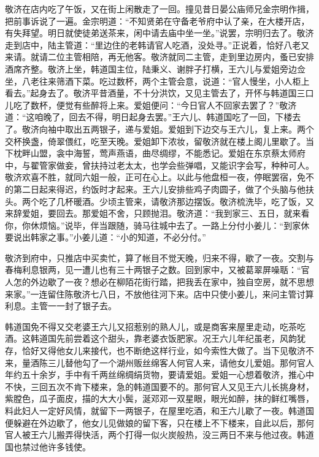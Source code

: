 敬济在店内吃了午饭，又在街上闲散走了一回。撞见昔日晏公庙师兄金宗明作揖，把前事诉说了一遍。金宗明道：“不知贤弟在守备老爷府中认了亲，在大楼开店，有失拜望。明日就使徒弟送茶来，闲中请去庙中坐一坐。”说罢，宗明归去了。敬济走到店中，陆主管道：“里边住的老韩请官人吃酒，没处寻。”正说着，恰好八老又来请。就请二位主管相陪，再无他客。敬济就同二主管，走到里边房内，蚤已安排酒席齐整。敬济上坐，韩道国主位，陆秉义、谢胖子打横，王六儿与爱姐旁边佥坐，八老往来筛酒下菜。吃过数杯，两个主管会意，说道：“官人慢坐，小人柜上看去。”起身去了。敬济平昔酒量，不十分洪饮，又见主管去了，开怀与韩道国三口儿吃了数杯，便觉有些醉将上来。爱姐便问：“今日官人不回家去罢了？”敬济道：“这咱晚了，回去不得，明日起身去罢。”王六儿、韩道国吃了一回，下楼去了。敬济向袖中取出五两银子，递与爱姐。爱姐到下边交与王六儿，复上来。两个交杯换盏，倚翠偎红，吃至天晚。爱姐卸下浓妆，留敬济就在楼上阁儿里歇了。当下枕畔山盟，衾中海誓，莺声燕语，曲尽绸缪，不能悉记。爱姐在东京蔡太师府中，与翟管家做妾，曾扶持过老太太，也学会些弹唱，又能识字会写，种种可人。敬济欢喜不胜，就同六姐一般，正可在心上。以此与他盘桓一夜，停眠罢宿，免不的第二日起来得迟，约饭时才起来。王六儿安排些鸡子肉圆子，做了个头脑与他扶头。两个吃了几杯暖酒。少顷主管来，请敬济那边摆饭。敬济梳洗毕，吃了饭，又来辞爱姐，要回去。那爱姐不舍，只顾抛泪。敬济道：“我到家三、五日，就来看你，你休烦恼。”说毕，伴当跟随，骑马往城中去了。一路上分付小姜儿：“到家休要说出韩家之事。”小姜儿道：“小的知道，不必分付。”

敬济到府中，只推店中买卖忙，算了帐目不觉天晚，归来不得，歇了一夜。交割与春梅利息银两，见一遭儿也有三十两银子之数。回到家中，又被葛翠屏噪聒：“官人怎的外边歇了一夜？想必在柳陌花街行踏，把我丢在家中，独自空房，就不思想来家。”一连留住陈敬济七八日，不放他往河下来。店中只使小姜儿，来问主管讨算利息。主管一一封了银子去。

韩道国免不得又交老婆王六儿又招惹别的熟人儿，或是商客来屋里走动，吃茶吃酒。这韩道国先前尝着这个甜头，靠老婆衣饭肥家。况王六儿年纪虽老，风韵犹存，恰好又得他女儿来接代，也不断绝这样行业，如今索性大做了。当下见敬济不来，量酒陈三儿替他勾了一个湖州贩丝绵客人何官人来，请他女儿爱姐。那何官人年约五十余岁，手中有千两丝绵绸绢货物，要请爱姐。爱姐一心想着敬济，推心中不快，三回五次不肯下楼来，急的韩道国要不的。那何官人又见王六儿长挑身材，紫膛色，瓜子面皮，描的大大小鬓，涎邓邓一双星眼，眼光如醉，抹的鲜红嘴唇，料此妇人一定好风情，就留下一两银子，在屋里吃酒，和王六儿歇了一夜。韩道国便躲避在外边歇了，他女儿见做娘的留下客，只在楼上不下楼来，自此以后，那何官人被王六儿搬弄得快活，两个打得一似火炭般热，没三两日不来与他过夜。韩道国也禁过他许多钱使。

